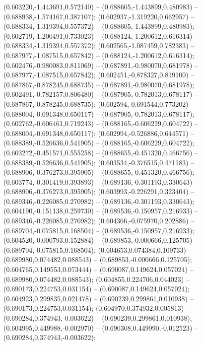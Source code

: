  (0.603220,-1.443691,0.572140) -- (0.688605,-1.443899,0.480983) -- (0.688938,-1.574167,0.387107);
 (0.602937,-1.319220,0.662957) -- (0.688334,-1.319394,0.557372) -- (0.688605,-1.443899,0.480983);
 (0.602719,-1.200491,0.733023) -- (0.688124,-1.200612,0.616314) -- (0.688334,-1.319394,0.557372);
 (0.602565,-1.087459,0.782383) -- (0.687977,-1.087515,0.657842) -- (0.688124,-1.200612,0.616314);
 (0.602476,-0.980083,0.811069) -- (0.687891,-0.980070,0.681978) -- (0.687977,-1.087515,0.657842);
 (0.602451,-0.878327,0.819100) -- (0.687867,-0.878245,0.688735) -- (0.687891,-0.980070,0.681978);
 (0.602491,-0.782157,0.806480) -- (0.687905,-0.782013,0.678117) -- (0.687867,-0.878245,0.688735);
 (0.602594,-0.691544,0.773202) -- (0.688004,-0.691348,0.650117) -- (0.687905,-0.782013,0.678117);
 (0.602762,-0.606461,0.719243) -- (0.688165,-0.606229,0.604722) -- (0.688004,-0.691348,0.650117);
 (0.602994,-0.526886,0.644571) -- (0.688389,-0.526636,0.541905) -- (0.688165,-0.606229,0.604722);
 (0.603272,-0.451571,0.555258) -- (0.688655,-0.451320,0.466756) -- (0.688389,-0.526636,0.541905);
 (0.603534,-0.376515,0.471183) -- (0.688906,-0.376273,0.395905) -- (0.688655,-0.451320,0.466756);
 (0.603774,-0.301419,0.393893) -- (0.689136,-0.301193,0.330643) -- (0.688906,-0.376273,0.395905);
 (0.603993,-0.226291,0.323404) -- (0.689346,-0.226085,0.270982) -- (0.689136,-0.301193,0.330643);
 (0.604190,-0.151138,0.259730) -- (0.689536,-0.150957,0.216933) -- (0.689346,-0.226085,0.270982);
 (0.604366,-0.075970,0.202886) -- (0.689704,-0.075815,0.168504) -- (0.689536,-0.150957,0.216933);
 (0.604520,-0.000793,0.152884) -- (0.689853,-0.000666,0.125705) -- (0.689704,-0.075815,0.168504);
 (0.604653,0.074384,0.109733) -- (0.689980,0.074482,0.088543) -- (0.689853,-0.000666,0.125705);
 (0.604765,0.149553,0.073444) -- (0.690087,0.149624,0.057024) -- (0.689980,0.074482,0.088543);
 (0.604855,0.224706,0.044023) -- (0.690173,0.224753,0.031154) -- (0.690087,0.149624,0.057024);
 (0.604923,0.299835,0.021478) -- (0.690239,0.299861,0.010938) -- (0.690173,0.224753,0.031154);
 (0.604970,0.374932,0.005813) -- (0.690284,0.374943,-0.003622) -- (0.690239,0.299861,0.010938);
 (0.604995,0.449988,-0.002970) -- (0.690308,0.449990,-0.012523) -- (0.690284,0.374943,-0.003622);
